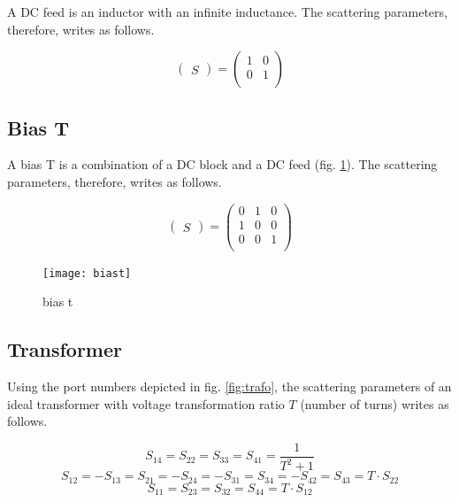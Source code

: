 \documentclass[10pt]{report}
\begin{document}
A DC feed is an inductor with an infinite inductance.  The scattering
parameters, therefore, writes as follows.

\begin{equation}
\begin{pmatrix}
S
\end{pmatrix}
=
\begin{pmatrix}
1 & 0\\
0 & 1\\
\end{pmatrix}
\end{equation}

\subsection{Bias T}

A bias T is a combination of a DC block and a DC feed
(fig. \ref{fig:biast}).  The scattering parameters, therefore, writes
as follows.

\begin{equation}
\begin{pmatrix}
S
\end{pmatrix}
=
\begin{pmatrix}
0 & 1 & 0\\
1 & 0 & 0\\
0 & 0 & 1\\
\end{pmatrix}
\end{equation}

\begin{figure}[ht]
\begin{center}
\texttt{[image: biast]}
\end{center}
\caption{bias t}
\label{fig:biast}
\end{figure}
\FloatBarrier

\subsection{Transformer}

Using the port numbers depicted in fig. \ref{fig:trafo}, the
scattering parameters of an ideal transformer with voltage
transformation ratio $T$ (number of turns) writes as follows.

\begin{equation}
S_{14} = S_{22} = S_{33} = S_{41} = \frac{1}{T^2+1}
\end{equation}
\begin{equation}
S_{12} = -S_{13} = S_{21} = -S_{24} = -S_{31} = S_{34} = -S_{42} = S_{43} = T\cdot S_{22}
\end{equation}
\begin{equation}
S_{11} = S_{23} = S_{32} = S_{44} = T\cdot S_{12}
\end{equation}
\end{document}
